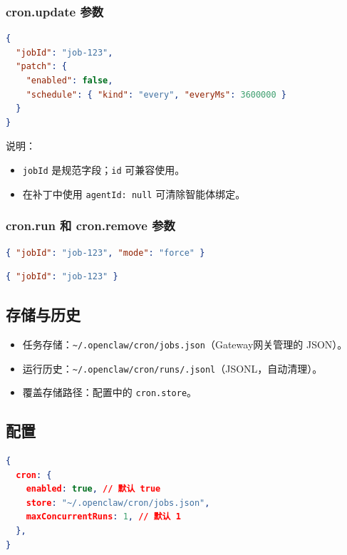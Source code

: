\subsubsection{cron.update 参数}


\begin{lstlisting}[language=json]
{
  "jobId": "job-123",
  "patch": {
    "enabled": false,
    "schedule": { "kind": "every", "everyMs": 3600000 }
  }
}
\end{lstlisting}


说明：

\begin{itemize}
  \item \texttt{jobId} 是规范字段；\texttt{id} 可兼容使用。
  \item 在补丁中使用 \texttt{agentId: null} 可清除智能体绑定。
\end{itemize}


\subsubsection{cron.run 和 cron.remove 参数}


\begin{lstlisting}[language=json]
{ "jobId": "job-123", "mode": "force" }
\end{lstlisting}


\begin{lstlisting}[language=json]
{ "jobId": "job-123" }
\end{lstlisting}


\subsection{存储与历史}


\begin{itemize}
  \item 任务存储：\texttt{\textasciitilde{}/.openclaw/cron/jobs.json}（Gateway网关管理的 JSON）。
  \item 运行历史：\texttt{\textasciitilde{}/.openclaw/cron/runs/.jsonl}（JSONL，自动清理）。
  \item 覆盖存储路径：配置中的 \texttt{cron.store}。
\end{itemize}


\subsection{配置}


\begin{lstlisting}[language=json]
{
  cron: {
    enabled: true, // 默认 true
    store: "~/.openclaw/cron/jobs.json",
    maxConcurrentRuns: 1, // 默认 1
  },
}
\end{lstlisting}


